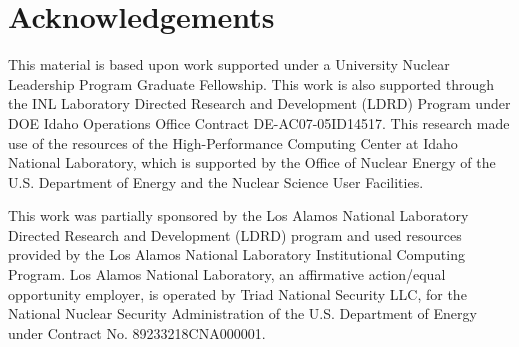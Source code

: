 \documentclass[review]{elsarticle}
\begin{document}
\section{Acknowledgements} 

This material is based upon work supported under a University Nuclear Leadership Program Graduate Fellowship. This work is also supported through the INL Laboratory Directed Research and Development (LDRD) Program under DOE Idaho Operations Office Contract DE-AC07-05ID14517. This research made use of the resources of the High-Performance Computing Center at Idaho National Laboratory, which is supported by the Office of Nuclear Energy of the U.S. Department of Energy and the Nuclear Science User Facilities.  

This work was partially sponsored by the Los Alamos National Laboratory Directed Research and Development (LDRD) program and used resources provided by the Los Alamos National Laboratory Institutional Computing Program. Los Alamos National Laboratory, an affirmative action/equal opportunity employer, is operated by Triad National Security LLC, for the National Nuclear Security Administration of the U.S. Department of Energy under Contract No. 89233218CNA000001.

\FloatBarrier


\end{document}
